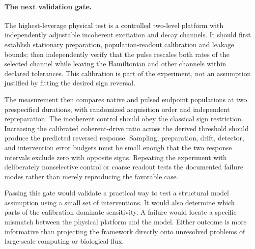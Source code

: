 \paragraph{The next validation gate.}
The highest-leverage physical test is a controlled two-level platform with
independently adjustable incoherent excitation and decay channels. It should
first establish stationary preparation, population-readout calibration and
leakage bounds; then independently verify that the pulse rescales both rates
of the selected channel while leaving the Hamiltonian and other channels
within declared tolerances. This calibration is part of the experiment,
not an assumption justified by fitting the desired sign reversal.

The measurement then compares native and pulsed endpoint populations at two
prespecified durations, with randomized acquisition order and independent
repreparation. The incoherent control should obey the classical sign
restriction. Increasing the calibrated coherent-drive ratio across the
derived threshold should produce the predicted reversed response. Sampling,
preparation, drift, detector, and intervention error budgets must be small
enough that the two response intervals exclude zero with opposite signs.
Repeating the experiment with deliberately nonselective control or coarse
readout tests the documented failure modes rather than merely reproducing
the favorable case.

Passing this gate would validate a practical way to test a structural model
assumption using a small set of interventions. It would also determine which
parts of the calibration dominate sensitivity. A failure would locate a
specific mismatch between the physical platform and the model. Either
outcome is more informative than projecting the framework directly onto
unresolved problems of large-scale computing or biological flux.
